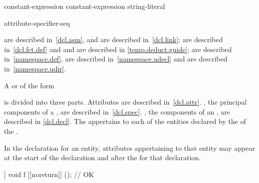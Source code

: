 \begin{bnf}
\br
   \terminal{(} constant-expression \terminal{)} \terminal{;}\br
   \terminal{(} constant-expression \terminal{,} string-literal \terminal{)} \terminal{;}
\end{bnf}

\begin{bnf}
\br
    \terminal{;}
\end{bnf}

\begin{bnf}
\br
    attribute-specifier-seq \terminal{;}
\end{bnf}

\begin{note}
 are described in~\ref{dcl.asm}, and
 are described in~\ref{dcl.link};
 are described in~\ref{dcl.fct.def} and
 and
 are described in \ref{temp.deduct.guide};
 are described in~\ref{namespace.def},
 are described in~\ref{namespace.udecl} and
 are described in~\ref{namespace.udir}.
\end{note}

\pnum
A
 or
 of the form
\begin{ncsimplebnf}
   \terminal{;}
\end{ncsimplebnf}
is divided into three parts.
Attributes are described in~\ref{dcl.attr}.
, the principal components of
a , are described in~\ref{dcl.spec}.
, the components of an
, are described in \ref{dcl.decl}.
The 
appertains to each of the entities declared by
the 
of the .
\begin{note}
In the declaration for an entity, attributes appertaining to that
entity may appear at the start of the declaration and after the
 for that declaration.
\end{note}
\begin{example}
\begin{codeblock}
[[noreturn]] void f [[noreturn]] ();    // OK
\end{codeblock}
\end{example}


